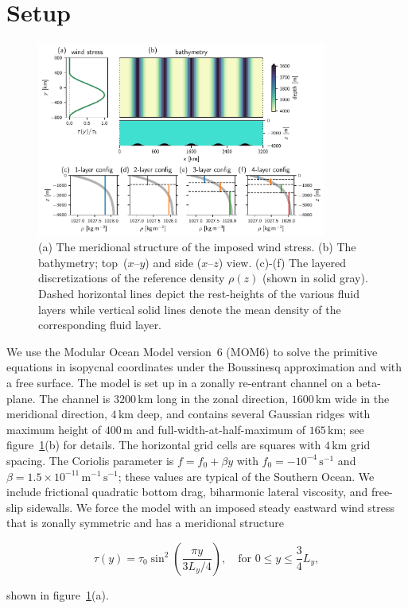 \documentclass{agujournal2019}
\begin{document}
\section{Setup}

\begin{figure}[t]
\centering
\noindent\includegraphics[width=0.85\textwidth]{domaindensities}
\vspace*{-0.5em}\caption{(a) The meridional structure of the imposed wind stress. (b) The bathymetry; top~($x$--$y$) and side ($x$--$z$) view. (c)-(f) The layered discretizations of the reference density $\rho(z)$ (shown in solid gray). Dashed horizontal lines depict the rest-heights of the various fluid layers while vertical solid lines denote the mean density of the corresponding fluid layer.}\label{fig:domain}\vspace*{-4em}
\end{figure}


We use the Modular Ocean Model version~6 (MOM6) to solve the primitive equations in isopycnal coordinates under the Boussinesq approximation and with a free surface. The model is set up in a zonally re-entrant channel on a beta-plane. The channel is $3200\,\mathrm{km}$ long in the zonal direction, $1600\,\mathrm{km}$ wide in the meridional direction, $4\,\mathrm{km}$ deep, and contains several Gaussian ridges with maximum height of $400\,\mathrm{m}$ and full-width-at-half-maximum of $165\,\mathrm{km}$; see figure~\ref{fig:domain}(b) for details. The horizontal grid cells are squares with $4\,\mathrm{km}$ grid spacing. The Coriolis parameter is $f=f_0+\beta y$ with $f_0=-10^{-4}\,\mathrm{s}^{-1}$ and $\beta=1.5\times 10^{-11}\,\mathrm{m}^{-1}\,\mathrm{s}^{-1}$; these values are typical of the Southern Ocean. We include frictional quadratic bottom drag, biharmonic lateral viscosity, and free-slip sidewalls. We force the model with an imposed steady eastward wind stress that is zonally symmetric and has a meridional structure 
\begin{linenomath*}
\begin{equation}
    \tau(y) = \tau_0 \sin^2 \left(\frac{\pi y}{3L_y/4}\right),\quad\text{for } 0\le y\le \frac{3}{4}L_y, \label{eq:windstress}
\end{equation} 
\end{linenomath*}
shown in figure~\ref{fig:domain}(a). 
\end{document}
